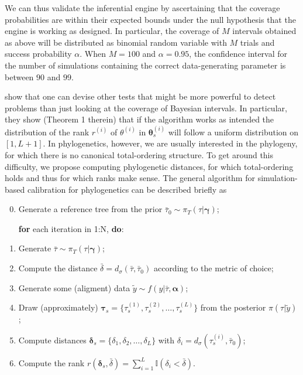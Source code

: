\documentclass[oneside]{article}
\begin{document}

We can thus validate the inferential engine by ascertaining that the coverage probabilities are within their expected bounds under the null hypothesis that the engine is working as designed.
In particular, the coverage of $M$ intervals obtained as above will be distributed as binomial random variable with $M$ trials and success probability $\alpha$.
When $M=100$ and $\alpha = 0.95$, the confidence interval for the number of simulations containing the correct data-generating parameter is between $90$ and $99$.
  
\cite{Talts2018} show that one can devise other tests that might be more powerful to detect problems than just looking at the coverage of Bayesian intervals.
In particular, they show (Theorem 1 therein) that if the algorithm works as intended the distribution of the rank $r^{(i)}$ of  $\theta^{(i)}$ in  $\boldsymbol\theta_s^{(i)}$ will follow a uniform distribution on $[1, L + 1]$.
In phylogenetics, however, we are usually interested in the phylogeny, for which there is no canonical total-ordering structure. 
To get around this difficulty, we propose computing phylogenetic distances, for which total-ordering holds and thus for which ranks make sense.
The general algorithm for simulation-based calibration for phylogenetics can be described briefly as
\begin{enumerate}
\setcounter{enumi}{-1}
 \item Generate a reference tree from the prior $\bar{\tau}_0  \sim \pi_T(\tau | \boldsymbol \gamma)$;
 
 \textbf{for} each iteration in 1:N, \textbf{do}:
 
 \item Generate $\bar{\tau} \sim \pi_T(\tau | \boldsymbol \gamma)$;
 \item Compute the distance $\bar{\delta} = d_\sigma(\bar{\tau},\bar{\tau}_0)$ according to the metric of choice;
 \item Generate some (aligment) data $\tilde{y} \sim f(y | \bar{\tau}, \boldsymbol\alpha)$;
 \item Draw (approximately) $\boldsymbol \tau_s = \{\tau_s^{(1)}, \tau_s^{(2)}, \ldots, \tau_s^{(L)}\}$ from the posterior $\pi(\tau | \tilde{y})$;
 \item Compute distances $\boldsymbol \delta_s = \{ \delta_1, \delta_2, \ldots, \delta_L \}$  with $\delta_i = d_\sigma(\tau_s^{(i)}, \bar{\tau}_0)$;
 \item Compute the rank $r(\boldsymbol\delta_s, \bar{\delta}) = \sum\limits_{i=1}^L \mathbb{I}(\delta_i < \bar{\delta})$.
\end{enumerate}
\end{document}
